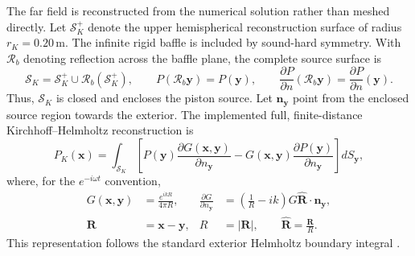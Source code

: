 \documentclass[final,12pt,nopreprintline,longtitle]{elsarticle}
\begin{document}
The far field is reconstructed from the numerical solution rather than meshed
directly.  Let $\mathcal{S}_K^+$ denote the upper hemispherical reconstruction
surface of radius $r_K=0.20\,\mathrm{m}$.
The infinite rigid baffle is included by sound-hard symmetry.  With
$\mathcal{R}_b$ denoting reflection across the baffle plane, the complete
source surface is
\begin{equation}
    \mathcal{S}_K
    =
    \mathcal{S}_K^+
    \cup\mathcal{R}_b(\mathcal{S}_K^+),
    \qquad
    P(\mathcal{R}_b\mathbf{y})=P(\mathbf{y}),
    \qquad
    \frac{\partial P}{\partial n}
    (\mathcal{R}_b\mathbf{y})
    =
    \frac{\partial P}{\partial n}(\mathbf{y}).
    \label{eq:soundHardMirror}
\end{equation}
Thus, $\mathcal{S}_K$ is closed and encloses the piston source.  Let
$\mathbf{n}_{\mathbf{y}}$ point from the enclosed source region towards the
exterior.  The implemented full, finite-distance Kirchhoff--Helmholtz
reconstruction is
\begin{equation}
    P_K(\mathbf{x})
    =\int_{\mathcal{S}_K}
    \left[
        P(\mathbf{y})
        \frac{\partial G(\mathbf{x},\mathbf{y})}
             {\partial n_{\mathbf{y}}}
        -G(\mathbf{x},\mathbf{y})
        \frac{\partial P(\mathbf{y})}{\partial n_{\mathbf{y}}}
    \right]dS_{\mathbf{y}},
    \label{eq:kirchhoffReconstruction}
\end{equation}
where, for the $e^{-i\omega t}$ convention,
\begin{equation}
    \begin{aligned}
        G(\mathbf{x},\mathbf{y})
        &=\frac{e^{ikR}}{4\pi R},
        &
        \frac{\partial G}{\partial n_{\mathbf{y}}}
        &=\left(\frac{1}{R}-ik\right)G
          \widehat{\mathbf{R}}\cdot\mathbf{n}_{\mathbf{y}},\\
        \mathbf{R}&=\mathbf{x}-\mathbf{y},
        &R&=|\mathbf{R}|,
        \qquad
        \widehat{\mathbf{R}}=\frac{\mathbf{R}}{R}.
    \end{aligned}
    \label{eq:kirchhoffGreenFunction}
\end{equation}
This representation follows the standard exterior Helmholtz boundary integral
\cite{morse1986theoretical}.
\end{document}
